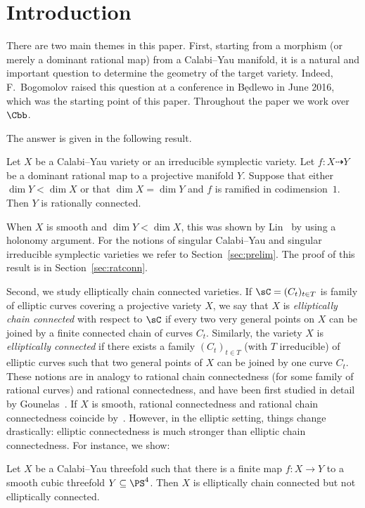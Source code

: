 \section{Introduction}

There are two main themes in this paper. First, starting from a morphism (or merely a dominant rational map) from a Calabi--Yau manifold, it is a natural and important question to determine the geometry of the target variety. Indeed, F.~Bogomolov raised this question at a conference in B\k{e}dlewo in June 2016, which was the starting point of this paper. Throughout the paper we work over $\Cbb$.

The answer is given in the following result.

\begin{theo}\label{thm:main1}
Let $X$ be a Calabi--Yau variety or an irreducible symplectic variety. Let $f\colon X \dasharrow Y$ be a dominant rational map to a projective manifold $Y$. Suppose that either $\dim Y < \dim X$ or that $\dim X = \dim Y$ and $f$ is ramified in codimension~$1$. Then $Y$ is rationally connected.
\end{theo}

When $X$ is smooth and $\dim Y < \dim X$, this was shown by Lin~\cite[Theorem~1.4]{Lin15} by using a holonomy argument. For the notions of singular Calabi--Yau and singular irreducible symplectic varieties we refer to Section~\ref{sec:prelim}. The proof of this result is in Section~\ref{sec:ratconn}.


Second, we study elliptically chain connected varieties. If $\sC = (C_t)_{t\in T}$ is family of elliptic curves covering a projective variety $X$, we say that $X$ is \emph{elliptically chain connected} with respect to $\sC$ if every two very general points on $X$ can be joined by a finite connected chain of curves $C_t$. Similarly, the variety $X$ is \emph{elliptically connected} if there exists a family $(C_t)_{t\in T}$ (with $T$ irreducible) of elliptic curves such that two general points of $X$ can be joined by one curve $C_t$. These notions are in analogy to rational chain connectedness (for some family of rational curves) and rational connectedness, and have been first studied in detail by Gounelas~\cite{Gou16}. If $X$ is smooth, rational connectedness and rational chain connectedness coincide by~\cite[2.1]{KMM92}. However, in the elliptic setting, things change drastically: elliptic connectedness is much stronger than elliptic chain connectedness. For instance, we show:

\begin{theo}\label{thm:main1.2}
Let $X$ be a Calabi--Yau threefold such that there is a finite map $f \colon X \to Y$ to a smooth cubic threefold $Y \subseteq \PS^4$. Then $X$ is elliptically chain connected but not elliptically connected.
\end{theo}

